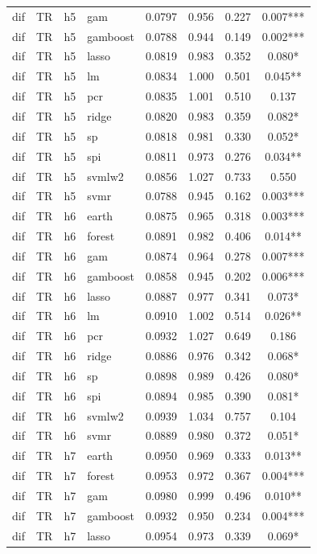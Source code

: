 \begin{ThreePartTable}
\begin{longtable}[t]{llclcccc}
dif & TR & h5 & gam & 0.0797 & 0.956 & 0.227 & 0.007***\\
dif & TR & h5 & gamboost & 0.0788 & 0.944 & 0.149 & 0.002***\\
dif & TR & h5 & lasso & 0.0819 & 0.983 & 0.352 & 0.080*\\
dif & TR & h5 & lm & 0.0834 & 1.000 & 0.501 & 0.045**\\
dif & TR & h5 & pcr & 0.0835 & 1.001 & 0.510 & 0.137\\
dif & TR & h5 & ridge & 0.0820 & 0.983 & 0.359 & 0.082*\\
dif & TR & h5 & sp & 0.0818 & 0.981 & 0.330 & 0.052*\\
dif & TR & h5 & spi & 0.0811 & 0.973 & 0.276 & 0.034**\\
dif & TR & h5 & svmlw2 & 0.0856 & 1.027 & 0.733 & 0.550\\
dif & TR & h5 & svmr & 0.0788 & 0.945 & 0.162 & 0.003***\\
\addlinespace
dif & TR & h6 & earth & 0.0875 & 0.965 & 0.318 & 0.003***\\
dif & TR & h6 & forest & 0.0891 & 0.982 & 0.406 & 0.014**\\
dif & TR & h6 & gam & 0.0874 & 0.964 & 0.278 & 0.007***\\
dif & TR & h6 & gamboost & 0.0858 & 0.945 & 0.202 & 0.006***\\
dif & TR & h6 & lasso & 0.0887 & 0.977 & 0.341 & 0.073*\\
dif & TR & h6 & lm & 0.0910 & 1.002 & 0.514 & 0.026**\\
dif & TR & h6 & pcr & 0.0932 & 1.027 & 0.649 & 0.186\\
dif & TR & h6 & ridge & 0.0886 & 0.976 & 0.342 & 0.068*\\
dif & TR & h6 & sp & 0.0898 & 0.989 & 0.426 & 0.080*\\
dif & TR & h6 & spi & 0.0894 & 0.985 & 0.390 & 0.081*\\
dif & TR & h6 & svmlw2 & 0.0939 & 1.034 & 0.757 & 0.104\\
dif & TR & h6 & svmr & 0.0889 & 0.980 & 0.372 & 0.051*\\
\addlinespace
dif & TR & h7 & earth & 0.0950 & 0.969 & 0.333 & 0.013**\\
dif & TR & h7 & forest & 0.0953 & 0.972 & 0.367 & 0.004***\\
dif & TR & h7 & gam & 0.0980 & 0.999 & 0.496 & 0.010**\\
dif & TR & h7 & gamboost & 0.0932 & 0.950 & 0.234 & 0.004***\\
dif & TR & h7 & lasso & 0.0954 & 0.973 & 0.339 & 0.069*\\

\end{longtable}
\end{ThreePartTable}
